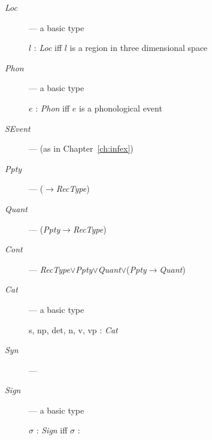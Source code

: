 \begin{description}

  \item[\textnormal{\textit{Loc}}] --- a basic type

  $l$ : \textit{Loc} iff $l$ is a region in three dimensional space

  
\item[\textnormal{\textit{Phon}}] --- a basic type

  $e$ : \textit{Phon} iff $e$ is a phonological event
  
\item[\textnormal{\textit{SEvent}}] ---  (as in
      Chapter~\ref{ch:infex})

      \item[\textnormal{\textit{Ppty}}] ---
        ($\rightarrow$\textit{RecType})
        
      \item[\textnormal{\textit{Quant}}] --- (\textit{Ppty}$\rightarrow$\textit{RecType})

    \item[\textnormal{\textit{Cont}}] --- \textit{RecType}$\vee$\textit{Ppty}$\vee$\textit{Quant}$\vee$(\textit{Ppty}$\rightarrow$\textit{Quant})

      
    \item[\textnormal{\textit{Cat}}] --- a basic type

      s, np, det, n, v, vp : \textit{Cat}

    
    \item[\textnormal{\textit{Syn}}] ---   
 


  
    \item[\textnormal{\textit{Sign}}] ---  a basic type

      $\sigma$ : \textit{Sign} iff $\sigma$ :


\end{description}
